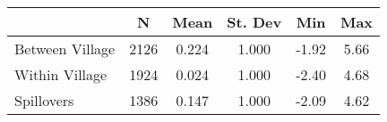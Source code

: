 \begin{tabular}{l*{5}{c}}\hline&\multicolumn{1}{c}{N}&\multicolumn{1}{c}{Mean}&\multicolumn{1}{c}{St. Dev}&\multicolumn{1}{c}{Min}&\multicolumn{1}{c}{Max}\\ \hline 
Between Village & 2126 & 0.224 & 1.000 & -1.92 & 5.66 \\
Within Village & 1924 & 0.024 & 1.000 & -2.40 & 4.68 \\
Spillovers & 1386 & 0.147 & 1.000 & -2.09 & 4.62 \\
\hline \end{tabular}
